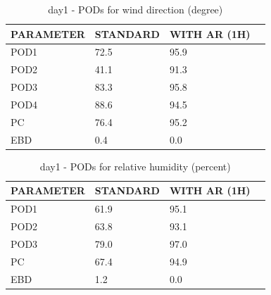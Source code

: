 \begin{table}[p!]
\begin{center}
\begin{tabular}{|l|l|l|l|}
\hline
\multicolumn{1}{|c|}{\cellcolor[HTML]{C0C0C0}\textbf{PARAMETER}} & \multicolumn{1}{c|}{\cellcolor[HTML]{C0C0C0}\textbf{STANDARD}} & \multicolumn{1}{c|}{\cellcolor[HTML]{C0C0C0}\textbf{WITH AR (1H)}} \\
\hline
\cellcolor[HTML]{C0C0C0}POD1  & 72.5      & 95.9     \\
\cellcolor[HTML]{C0C0C0}POD2  & 41.1      & 91.3     \\
\cellcolor[HTML]{C0C0C0}POD3  & 83.3      & 95.8     \\
\cellcolor[HTML]{C0C0C0}POD4  & 88.6      & 94.5     \\
\cellcolor[HTML]{C0C0C0}PC    & 76.4        & 95.2       \\
\cellcolor[HTML]{C0C0C0}EBD   & 0.4       & 0.0      \\
\hline
\end{tabular}
\caption{day1 - PODs for wind direction (degree)}
\label{tab:podwd:day1}
\end{center}
\end{table}
\begin{table}[p!]
\begin{center}
\begin{tabular}{|l|l|l|l|}
\hline
\multicolumn{1}{|c|}{\cellcolor[HTML]{C0C0C0}\textbf{PARAMETER}} & \multicolumn{1}{c|}{\cellcolor[HTML]{C0C0C0}\textbf{STANDARD}} & \multicolumn{1}{c|}{\cellcolor[HTML]{C0C0C0}\textbf{WITH AR (1H)}} \\
\hline
\cellcolor[HTML]{C0C0C0}POD1  & 61.9                                & 95.1         \\
\cellcolor[HTML]{C0C0C0}POD2  & 63.8                                & 93.1         \\
\cellcolor[HTML]{C0C0C0}POD3  & 79.0                                & 97.0         \\
\cellcolor[HTML]{C0C0C0}PC    & 67.4                                  & 94.9           \\
\cellcolor[HTML]{C0C0C0}EBD   & 1.2                                 & 0.0          \\
\hline
\end{tabular}
\caption{day1 - PODs for relative humidity (percent)}
\label{tab:podrh:day1}
\end{center}
\end{table}
